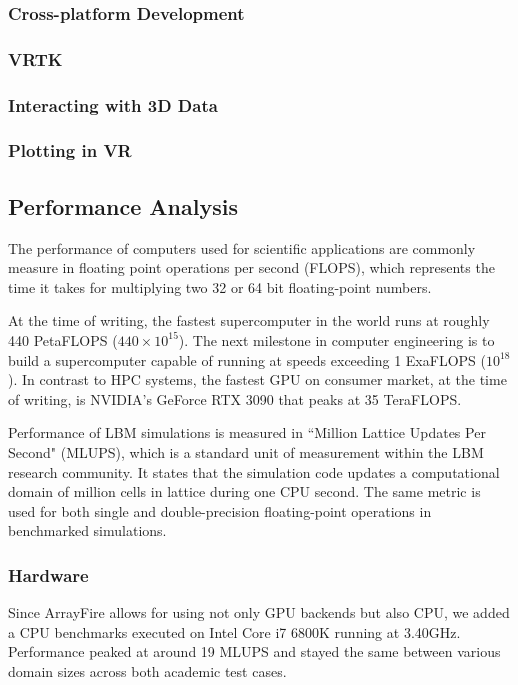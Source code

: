 \subsubsection{Cross-platform Development}

\subsubsection{VRTK} %

\subsubsection{Interacting with 3D Data}

\subsubsection{Plotting in VR}


\subsection{Performance Analysis}
The performance of computers used for scientific applications are commonly measure in floating point operations per second (FLOPS), which represents the time it takes for multiplying two 32 or 64 bit floating-point numbers.

At the time of writing, the fastest supercomputer in the world runs at roughly 440 PetaFLOPS ($440\times10^{15}$). The next milestone in computer engineering is to build a supercomputer capable of running at speeds exceeding 1 ExaFLOPS ($10^{18}$). In contrast to HPC systems, the fastest GPU on consumer market, at the time of writing, is NVIDIA's GeForce RTX 3090 that peaks at 35 TeraFLOPS.

Performance of LBM simulations is measured in ``Million Lattice Updates Per Second" (MLUPS), which is a standard unit of measurement within the LBM research community. It states that the simulation code updates a computational domain of million cells in lattice during one CPU second. The same metric is used for both single and double-precision floating-point operations in benchmarked simulations. 

\subsubsection{Hardware}
Since ArrayFire allows for using not only GPU backends but also CPU, we added a CPU benchmarks executed on Intel Core i7 6800K running at 3.40GHz. Performance peaked at around 19 MLUPS and stayed the same between various domain sizes across both academic test cases.

